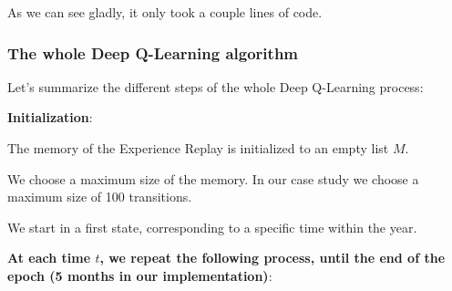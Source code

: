 \documentclass[]{book}
\begin{document}
As we can see gladly, it only took a couple lines of code.

\subsubsection{The whole Deep Q-Learning algorithm}

Let's summarize the different steps of the whole Deep Q-Learning process:

\textbf{Initialization}:

The memory of the Experience Replay is initialized to an empty list \(M\).

We choose a maximum size of the memory. In our case study we choose a maximum size of 100 transitions.

We start in a first state, corresponding to a specific time within the year.

\textbf{At each time $t$, we repeat the following process, until the end of the epoch (5 months in our implementation)}:
\end{document}
